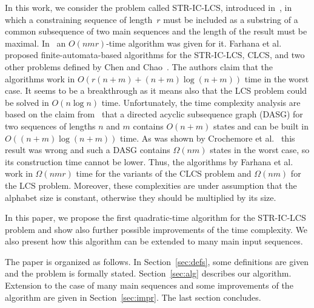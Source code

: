 \documentclass[12pt]{article}
\begin{document}
In this work, we consider the problem called STR-IC-LCS, introduced in~\cite{CC2011}, in which a constraining sequence of length~$r$ must be included as a substring of a common subsequence of two main sequences and the length of the result must be maximal.
In~\cite{CC2011} an $O(nmr)$-time algorithm was given for it.
Farhana et al.~\cite{FFMR2010} proposed finite-automata-based algorithms for the STR-IC-LCS, CLCS, and two other problems defined by Chen and Chao~\cite{CC2011}.
The authors claim that the algorithms work in $O(r(n+m)+ (n+m)\log (n+m))$ time in the worst case.
It seems to be a breakthrough as it means also that the LCS problem could be solved in $O(n\log n)$ time.
Unfortunately, the time complexity analysis are based on the claim from~\cite{BY1991} that a directed acyclic subsequence graph (DASG) for two sequences of lengths $n$ and $m$ contains $O(n + m)$ states and can be built in $O((n+m)\log(n+m))$ time.
As was shown by Crochemore et al.~\cite{CMT2003} this result was wrong and such a DASG contains $\Omega(nm)$ states in the worst case, so its construction time cannot be lower.
Thus, the algorithms by Farhana et al.~\cite{FFMR2010} work in $\Omega(nmr)$ time for the variants of the CLCS problem and $\Omega(nm)$ for the LCS problem.
Moreover, these complexities are under assumption that the alphabet size is constant, otherwise they should be multiplied by its size.




In this paper, we propose the first quadratic-time algorithm for the STR-IC-LCS problem and show also further possible improvements of the time complexity.
We also present how this algorithm can be extended to many main input sequences.

The paper is organized as follows.
In Section~\ref{sec:defs}, some definitions are given and the problem is formally stated.
Section~\ref{sec:alg} describes our algorithm.
Extension to the case of many main sequences and some improvements of the algorithm are given in Section~\ref{sec:impr}.
The last section concludes.
\end{document}
